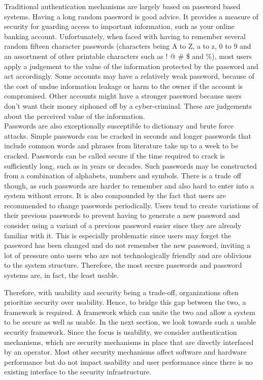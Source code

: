 Traditional authentication mechanisms are largely based on password based systems. Having a long random password is good advice. It provides a measure of security for guarding access to important information, such as your online banking account. 
Unfortunately, when faced with having to remember several random fifteen character passwords (characters being A to Z, a to z, 0 to 9 and an assortment of other printable characters such as ! @ \# \$ and \%), most users apply a judgement to the value of the information protected by the password and act accordingly. 
Some accounts may have a relatively weak password, because of the cost of undue information leakage or harm to the owner if the account is compromised. Other accounts might have a stronger password because users don't want their money siphoned off by a cyber-criminal. These are judgements about the perceived value of the information. \\
Passwords are also exceptionally susceptible to dictionary and brute force attacks. Simple passwords can be cracked in seconds and longer passwords that include common words and phrases from literature take up to a week to be cracked. Passwords can be called secure if the time required to crack is sufficiently long, such as in years or decades. Such passwords may be constructed from a combination of alphabets, numbers and symbols. There is a trade off though, as such passwords are harder to remember and also hard to enter into a system without errors. It is also compounded by the fact that users are recommended to change passwords periodically. Users tend to create variations of their previous passwords to prevent having to generate a new password and consider using a variant of a previous password easier since they are already familiar with it. This is especially problematic since users may forget the password has been changed and do not remember the new password, inviting a lot of pressure onto users who are not technologically friendly and are oblivious to the system structure. Therefore, the most secure passwords and password systems are, in fact, the least usable. 


\smallskip

Therefore, with usability and security being a trade-off, organizations often prioritize security over usability. Hence, to bridge this gap between the two, a framework is required. A framework which can unite the two and allow a system to be secure as well as usable. In the next section, we look towards such a usable security framework. Since the focus is usability, we consider authentication mechanisms, which are security mechanisms in place that are directly interfaced by an operator. Most other security mechanisms affect software and hardware performance but do not impact usability and user performance since there is no existing interface to the security infrastructure.

